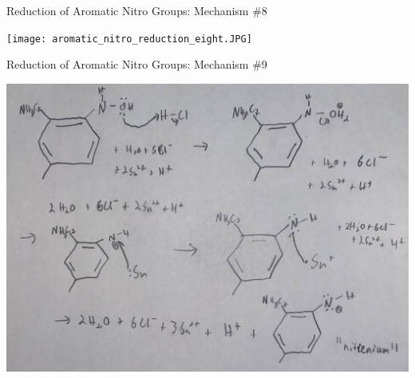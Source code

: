 \documentclass[notes]{beamer}
\begin{document}
\begin{frame}{Reduction of Aromatic Nitro Groups: Mechanism \#8}
    \begin{center}
        \texttt{[image: aromatic\_nitro\_reduction\_eight.JPG]}
    \end{center}
    
\end{frame}

\begin{frame}{Reduction of Aromatic Nitro Groups: Mechanism \#9}
    \begin{center}
        \includegraphics[scale=.32]{aromatic_nitro_reduction_nine.JPG}
    \end{center}
    
\end{frame}
\end{document}
